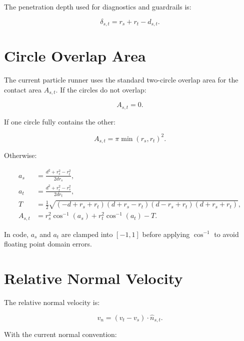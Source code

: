 The penetration depth used for diagnostics and guardrails is:

\begin{equation}
\delta_{s,t} = r_s + r_t - d_{s,t}.
\end{equation}

\section{Circle Overlap Area}
\label{sec:circle-overlap-area}

The current particle runner uses the standard two-circle overlap area for the
contact area $A_{s,t}$.  If the circles do not overlap:

\begin{equation}
A_{s,t} = 0.
\end{equation}

If one circle fully contains the other:

\begin{equation}
A_{s,t} = \pi \min(r_s,r_t)^2.
\end{equation}

Otherwise:

\begin{equation}
\begin{aligned}
a_s &=
\frac{d^2 + r_s^2 - r_t^2}{2 d r_s}, \\
a_t &=
\frac{d^2 + r_t^2 - r_s^2}{2 d r_t}, \\
T &=
\frac{1}{2}
\sqrt{
(-d+r_s+r_t)(d+r_s-r_t)(d-r_s+r_t)(d+r_s+r_t)
}, \\
A_{s,t} &=
r_s^2 \cos^{-1}(a_s)
+ r_t^2 \cos^{-1}(a_t)
- T.
\end{aligned}
\end{equation}

In code, $a_s$ and $a_t$ are clamped into $[-1,1]$ before applying
$\cos^{-1}$ to avoid floating point domain errors.

\section{Relative Normal Velocity}
\label{sec:relative-normal-velocity}

The relative normal velocity is:

\begin{equation}
v_n = (v_t - v_s) \cdot \hat{n}_{s,t}.
\end{equation}

With the current normal convention:

